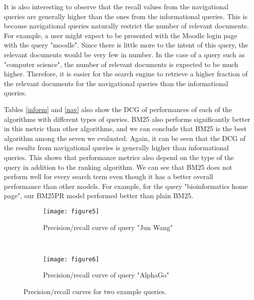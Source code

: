 It is also interesting to observe that the recall values from the navigational queries are generally higher than the ones from the informational queries. This is because navigational queries naturally restrict the number of relevant documents. For example, a user might expect to be presented with the Moodle login page with the query "moodle". Since there is little more to the intent of this query, the relevant documents would be very few in number. In the case of a query such as "computer science", the number of relevant documents is expected to be much higher. Therefore, it is easier for the search engine to retrieve a higher fraction of the relevant documents for the navigational queries than the informational queries.

Tables \ref{inform} and \ref{nav} also show the DCG of performances of each of the algorithms with different types of queries. BM25 also performs significantly better in this metric than other algorithms, and we can conclude that BM25 is the best algorithm among the seven we evaluated. Again, it can be seen that the DCG of the results from navigational queries is generally higher than informational queries. This shows that performance metrics also depend on the type of the query in addition to the ranking algorithm. We can see that BM25 does not perform well for every search term even though it has a better overall performance than other models. For example, for the query "bioinformatics home page", our BM25PR model performed better than plain BM25.

\begin{figure*}[!t]
    \centering
    \begin{subfigure}{0.5\textwidth}
        \centering
        \texttt{[image: figure5]}
        \caption{Precision/recall curve of query "Jun Wang"}
        \label{fig:junwang}
        \vskip -6pt
    \end{subfigure}%
    ~ 
    \begin{subfigure}{0.5\textwidth}
        \centering
        \texttt{[image: figure6]}
        \caption{Precision/recall curve of query "AlphaGo"}
        \label{fig:alphago}
        \vskip -6pt
    \end{subfigure}
    \caption{Precision/recall curves for two example queries.}
\end{figure*}

